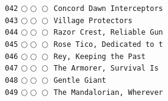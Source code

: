 \documentclass[a4paper,landscape]{article}
\begin{document}
\begin{multicols*}{5}
\texttt{042} \(\bigcirc\!\bigcirc\!\bigcirc\)  \texttt{Concord Dawn Interceptors} \vspace{-0.3mm}\\ 
\texttt{043} \(\bigcirc\!\bigcirc\!\bigcirc\)  \texttt{Village Protectors} \vspace{-0.3mm}\\ 
\texttt{044} \(\bigcirc\!\bigcirc\!\bigcirc\)  \texttt{Razor Crest, Reliable Gun} \vspace{-0.3mm}\\ 
\texttt{045} \(\bigcirc\!\bigcirc\!\bigcirc\)  \texttt{Rose Tico, Dedicated to t} \vspace{-0.3mm}\\ 
\texttt{046} \(\bigcirc\!\bigcirc\!\bigcirc\)  \texttt{Rey, Keeping the Past} \vspace{-0.3mm}\\ 
\texttt{047} \(\bigcirc\!\bigcirc\!\bigcirc\)  \texttt{The Armorer, Survival Is } \vspace{-0.3mm}\\ 
\texttt{048} \(\bigcirc\!\bigcirc\!\bigcirc\)  \texttt{Gentle Giant} \vspace{-0.3mm}\\ 
\texttt{049} \(\bigcirc\!\bigcirc\!\bigcirc\)  \texttt{The Mandalorian, Wherever} \vspace{-0.3mm}\\ 

\end{multicols*}
\end{document}
